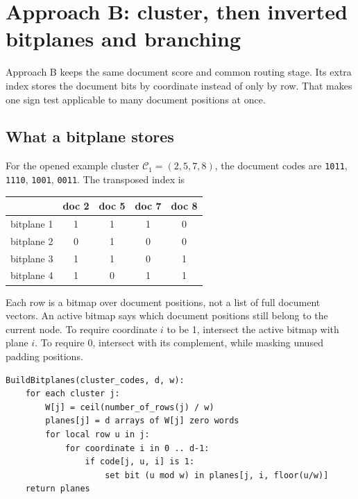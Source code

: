 \section{Approach B: cluster, then inverted bitplanes and branching}
\label{sec:bitplanes}
Approach B keeps the same document score and common routing stage. Its extra index stores
the document bits by coordinate instead of only by row. That makes one sign test applicable
to many document positions at once.


\subsection{What a bitplane stores}
For the opened example cluster $\mathcal C_1=(2,5,7,8)$, the document codes are
\texttt{1011}, \texttt{1110}, \texttt{1001}, \texttt{0011}. The transposed index is
\begin{center}
\begin{tabular}{@{}lcccc@{}}\toprule
 & doc 2 & doc 5 & doc 7 & doc 8\\\midrule
bitplane 1 & 1&1&1&0\\
bitplane 2 & 0&1&0&0\\
bitplane 3 & 1&1&0&1\\
bitplane 4 & 1&0&1&1\\\bottomrule
\end{tabular}
\end{center}
Each row is a bitmap over document positions, not a list of full document vectors. An active
bitmap says which document positions still belong to the current node. To require coordinate
$i$ to be 1, intersect the active bitmap with plane $i$. To require 0, intersect with its
complement, while masking unused padding positions.

\par\noindent\begin{minipage}{\linewidth}
\begin{lstlisting}[caption={Build the additional bitplane index.}]
BuildBitplanes(cluster_codes, d, w):
    for each cluster j:
        W[j] = ceil(number_of_rows(j) / w)
        planes[j] = d arrays of W[j] zero words
        for local row u in j:
            for coordinate i in 0 .. d-1:
                if code[j, u, i] is 1:
                    set bit (u mod w) in planes[j, i, floor(u/w)]
    return planes
\end{lstlisting}
\end{minipage}\par

